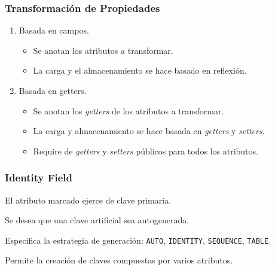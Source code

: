 \documentclass[a4paper,slidestop,xcolor=pst,blue]{beamer}
\begin{document}
\begin{frame}[c]
    \frametitle{Transformación de Propiedades}
    \begin{enumerate}[<+->]
        \item<1-> Basada en campos.
            \begin{itemize}
                \item<2-> Se anotan los atributos a transformar.
                \item<3-> La carga y el almacenamiento se hace basado en reflexión.
            \end{itemize}
        \item<3-> Basada en getters.
            \begin{itemize}
                \item<4-> Se anotan los \emph{getters} de los atributos a transformar.
                \item<5-> La carga y almacenamiento se hace basada en \emph{getters} y \emph{setters}.
                \item<6-> Require de \emph{getters} y \emph{setters} públicos para todos los atributos.
            \end{itemize}
    \end{enumerate}
\end{frame}



%

\begin{frame}[c]
    \frametitle{Identity Field}
    \begin{description}
        \item<1->[@Id] El atributo marcado ejerce de clave primaria.
        \item<2->[@GeneratedValue] Se desea que una clave artificial sea autogenerada.
            \begin{description}
                \item<3->[strategy] Especifica la estrategia de generación: \texttt{AUTO}, \texttt{IDENTITY}, \texttt{SEQUENCE}, \texttt{TABLE}.
            \end{description}
        \item<4->[@IdClass,@EmbeededId] Permite la creación de claves compuestas por varios atributos.
    \end{description}
\end{frame}
   
\end{document}
